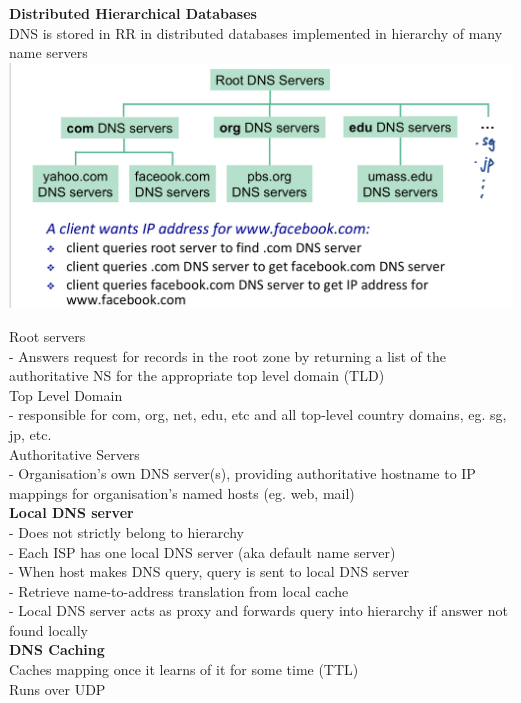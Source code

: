 \documentclass[10pt, a4paper]{article}
\newcommand{\red}[1]{{\color{red}#1}}
\begin{document}
\begin{multicols*}{3}
		\textbf{Distributed Hierarchical Databases}\\
		DNS is stored in RR in distributed databases implemented in hierarchy of many name servers\\
		\includegraphics[scale=.13]{./assets/dnsDatabases}

		Root servers\\
		- Answers request for records in the root zone by returning a list of the authoritative NS for the appropriate top level domain (TLD)\\

		Top Level Domain\\
		- responsible for com, org, net, edu, etc and all top-level country domains, eg. sg, jp, etc.\\

		Authoritative Servers\\
		- Organisation's own DNS server(s), providing authoritative hostname to IP mappings for organisation's named hosts (eg. web, mail)\\

		\textbf{Local DNS server}\\
		- Does not strictly belong to hierarchy\\
		- Each ISP has one local DNS server (aka default name server)\\
		- When host makes DNS query, query is sent to local DNS server\\
		- Retrieve name-to-address translation from local cache\\
		- Local DNS server acts as proxy and forwards query into hierarchy if answer not found locally\\

		\textbf{DNS Caching}\\
		Caches mapping once it learns of it for some time (TTL)\\
		Runs over \red{UDP}\\


\end{multicols*}
\end{document}
